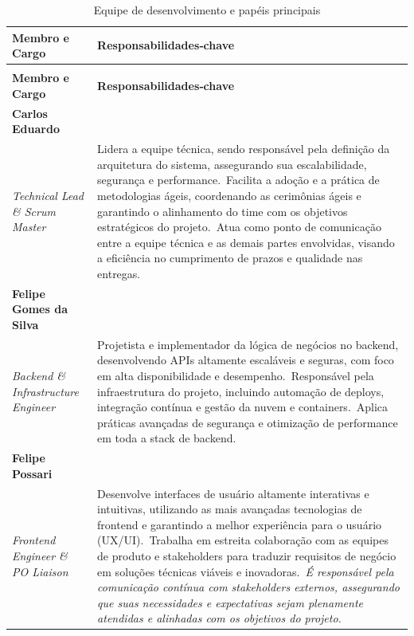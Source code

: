 \documentclass[a5paper, 12pt]{article}
\begin{document}
\newpage
\begin{longtable}[c]{@{} >{\raggedright\arraybackslash}p{4.5cm}>{\raggedright\arraybackslash}p{11cm} @{}}
  \caption{Equipe de desenvolvimento e papéis principais} \\
  \toprule
  \textbf{Membro e Cargo} & \textbf{Responsabilidades‑chave} \\
  \midrule
\endfirsthead

\multicolumn{2}{@{}l}{\textbf{Continuação da página anterior}} \\
  \toprule
  \textbf{Membro e Cargo} & \textbf{Responsabilidades‑chave} \\
  \midrule
\endhead

\bottomrule
\endfoot

\textbf{Carlos Eduardo} \\ \textit{Technical Lead \& Scrum Master} &
  Lidera a equipe técnica, sendo responsável pela definição da arquitetura do sistema, assegurando sua escalabilidade, segurança e performance.\
  Facilita a adoção e a prática de metodologias ágeis, coordenando as cerimônias ágeis e garantindo o alinhamento do time com os objetivos estratégicos do projeto.\
  Atua como ponto de comunicação entre a equipe técnica e as demais partes envolvidas, visando a eficiência no cumprimento de prazos e qualidade nas entregas. \\

\textbf{Felipe Gomes da Silva} \\ \textit{Backend \& Infrastructure Engineer} &
  Projetista e implementador da lógica de negócios no backend, desenvolvendo APIs altamente escaláveis e seguras, com foco em alta disponibilidade e desempenho.\
  Responsável pela infraestrutura do projeto, incluindo automação de deploys, integração contínua e gestão da nuvem e containers.\
  Aplica práticas avançadas de segurança e otimização de performance em toda a stack de backend. \\

\textbf{Felipe Possari} \\ \textit{Frontend Engineer \& PO Liaison} &
  Desenvolve interfaces de usuário altamente interativas e intuitivas, utilizando as mais avançadas tecnologias de frontend e garantindo a melhor experiência para o usuário (UX/UI).\
  Trabalha em estreita colaboração com as equipes de produto e stakeholders para traduzir requisitos de negócio em soluções técnicas viáveis e inovadoras.\
  \textit{É responsável pela comunicação contínua com stakeholders externos, assegurando que suas necessidades e expectativas sejam plenamente atendidas e alinhadas com os objetivos do projeto.} \\


\end{longtable}
\end{document}
